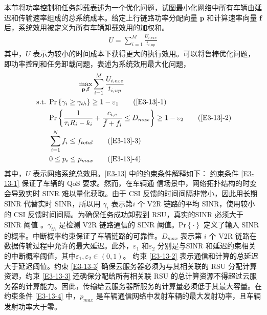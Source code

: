 本节将功率控制和任务卸载表述为一个优化问题，试图最小化网络中所有车辆由延迟和传输速率组成的总系统成本。给定上行链路功率分配向量 $\mathbf{p}$ 和计算速率向量 $\mathbf{f}$ 后，系统效用被定义为所有车辆卸载效用的加权和。
\begin{eqnarray}\label{E12}
U=\sum_{i=1}^{M}\frac{U_{i,exe}}{t_{i,up}}
\end{eqnarray}
其中，$U$ 表示为较小的时间成本下获得更大的执行效用。可以将鲁棒优化问题，即功率控制和任务卸载问题，表述为系统效用最大化问题，
\begin{align}
 &\qquad\qquad\max\limits_{\mathbf{p},\mathbf{f}}\sum_{i=1}^{M}\frac{U_{i,exe}}{t_{i,up}}                                   \label{E3-13}\\
\text { s.t. }
& \textrm{Pr}\left\{\gamma_i\geq\gamma_{th}\right\}\geq1-\varepsilon_1                                         \tag{\ref{E3-13}{-1}}      \label{E3-13-1}\\  %
& \textrm{Pr}\left\{\frac{1}{\tau_iR_i-k_i}+\frac{c_{i,e}}{\bar{f}+f_i}\le D_{max}\right\}\geq1-\varepsilon_2  \tag{\ref{E3-13}{-2}}      \label{E3-13-2}\\  %
& \sum_{i=1}^{N}f_i\le f_{total}                                                                                \tag{\ref{E3-13}{-3}}      \label{E3-13-3}\\  %
& 0 \le p_i\le p_{max}                                                                                          \tag{\ref{E3-13}{-4}}      \label{E3-13-4} %
\end{align}
其中，$U$ 表示网络系统总效用。\eqref{E3-13} 中的约束条件解释如下： 约束条件 \eqref{E3-13-1} 保证了车辆的 QoS 要求。然而，在车辆通
信场景中，网络拓扑结构的时变会导致实时 SINR 难以量化获取。由于 CSI 反馈的时间间隔非常小，因此用长期 SINR 代替实时 SINR，所以用 $\gamma_i$ 表示第$i$ 个 V2R {链路的平均 SINR，使用较小的 CSI 反馈时间间隔}。为确保任务成功卸载到 RSU，真实的SINR 必须大于 SINR 阈值 \cite{liu2021}。$\gamma_{th}$ 是检测 V2R 链路通信的 SINR 阈值。$\textrm{Pr}\left\{\cdot\right\}$ 定义了输入 SINR 的概率。中断概率约束保证了车辆链路的可靠性。$D_{max}$ 表示第 $i$ 个 V2R 链路在数据传输过程中允许的最大延迟。此外，$\varepsilon_1$ 和$\varepsilon_2$ 分别是与SINR 和延迟约束相关的中断概率阈值，其中$\varepsilon_1,\varepsilon_2\in\left(0,1\right)$。 约束 \eqref{E3-13-2} 表示通信和计算的总延迟大于延迟阈值。约束 \eqref{E3-13-3} 确保云服务器必须为与其相关联的 RSU 分配计算资源，约束 \eqref{E3-13-3} 还确保分配给所有相关联 RSU 的总计算资源不得超过云服务器的计算能力。因此，传输给云服务器所服务的计算量必须低于其最大容量。在约束条件 \eqref{E3-13-4} 中，$p_{max}$ 是车辆通信网络中发射车辆的最大发射功率，且车辆发射功率大于零。
